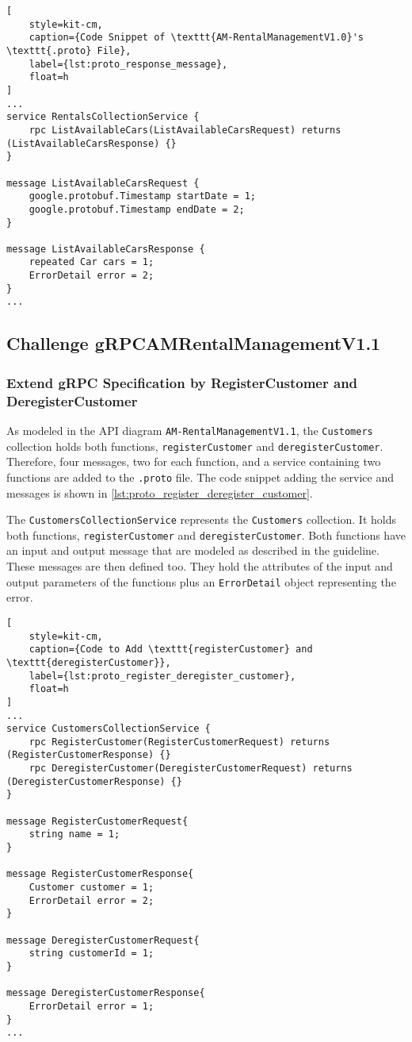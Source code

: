 \begin{lstlisting}[
    style=kit-cm,
    caption={Code Snippet of \texttt{AM-RentalManagementV1.0}'s \texttt{.proto} File},
    label={lst:proto_response_message},
    float=h
]
...
service RentalsCollectionService {
    rpc ListAvailableCars(ListAvailableCarsRequest) returns (ListAvailableCarsResponse) {}
}

message ListAvailableCarsRequest {  
    google.protobuf.Timestamp startDate = 1;
    google.protobuf.Timestamp endDate = 2;
}

message ListAvailableCarsResponse {
    repeated Car cars = 1;
    ErrorDetail error = 2;
}
...
\end{lstlisting}

\subsection{Challenge gRPCAMRentalManagementV1.1}
\subsubsection*{Extend gRPC Specification by RegisterCustomer and DeregisterCustomer}
As modeled in the API diagram \texttt{AM-RentalManagementV1.1}, the \texttt{Customers} collection holds both functions, \texttt{registerCustomer} and \texttt{deregisterCustomer}.
Therefore, four messages, two for each function, and a service containing two functions are added to the \texttt{.proto} file.
The code snippet adding the service and messages is shown in \autoref{lst:proto_register_deregister_customer}.

The \texttt{CustomersCollectionService} represents the \texttt{Customers} collection.
It holds both functions, \texttt{registerCustomer} and \texttt{deregisterCustomer}.
Both functions have an input and output message that are modeled as described in the guideline.
These messages are then defined too.
They hold the attributes of the input and output parameters of the functions plus an \texttt{ErrorDetail} object representing the error.

\begin{lstlisting}[
    style=kit-cm,
    caption={Code to Add \texttt{registerCustomer} and \texttt{deregisterCustomer}},
    label={lst:proto_register_deregister_customer},
    float=h
]
... 
service CustomersCollectionService {
    rpc RegisterCustomer(RegisterCustomerRequest) returns (RegisterCustomerResponse) {}
    rpc DeregisterCustomer(DeregisterCustomerRequest) returns (DeregisterCustomerResponse) {}
}

message RegisterCustomerRequest{
    string name = 1;
}

message RegisterCustomerResponse{
    Customer customer = 1;
    ErrorDetail error = 2;
}

message DeregisterCustomerRequest{
    string customerId = 1;
}

message DeregisterCustomerResponse{
    ErrorDetail error = 1;
}
...
\end{lstlisting}
